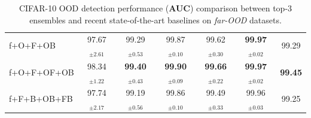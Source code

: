 \begin{table}
{\begin{tabular}{|l|cccccc|}
f+O+F+OB    & 97.67$_{\pm 2.61}$ & 99.29$_{\pm 0.53}$ & 99.87$_{\pm 0.10}$ & 99.62$_{\pm 0.30}$ & \textbf{99.97$_{\pm 0.02}$} &  \multicolumn{1}{|c|}{99.29}    \\ 
f+O+F+OF+OB  & 98.34$_{\pm 1.22}$ & \textbf{99.40$_{\pm 0.43}$} & \textbf{99.90$_{\pm 0.09}$} & \textbf{99.66$_{\pm 0.22}$} & \textbf{99.97$_{\pm 0.02}$} &  \multicolumn{1}{|c|}{\textbf{99.45}}      \\ 
f+F+B+OB+FB & 97.74$_{\pm 2.17}$  &  99.19$_{\pm 0.56}$ & 99.86$_{\pm 0.10}$ & 99.49$_{\pm 0.33}$ & 99.96$_{\pm 0.03}$ &  \multicolumn{1}{|c|}{99.25}       \\  \hline
\end{tabular}
}
\caption{CIFAR-10 OOD detection performance (\textbf{AUC}) comparison between top-3 \sysb ensembles and recent state-of-the-art baselines on \textit{far-OOD} datasets. %
}
\label{tab:propwork-meo-results-cifar10-far}
\end{table}



